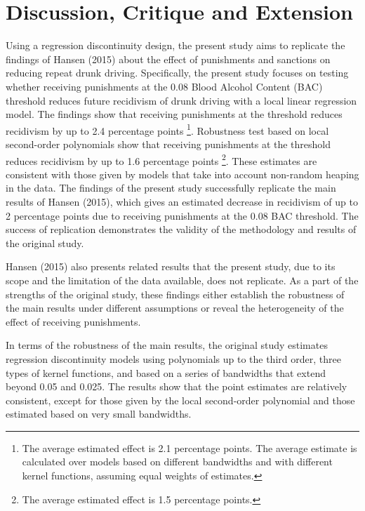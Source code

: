 \documentclass[
  11pt,
]{article}
\begin{document}
\endgroup

\hypertarget{discussion-critique-and-extension}{%
\section{Discussion, Critique and
Extension}\label{discussion-critique-and-extension}}

Using a regression discontinuity design, the present study aims to
replicate the findings of Hansen (2015) about the effect of punishments
and sanctions on reducing repeat drunk driving. Specifically, the
present study focuses on testing whether receiving punishments at the
0.08 Blood Alcohol Content (BAC) threshold reduces future recidivism of
drunk driving with a local linear regression model. The findings show
that receiving punishments at the threshold reduces recidivism by up to
2.4 percentage points
\footnote{The average estimated effect is 2.1 percentage points. The average estimate is calculated over models based on different bandwidths and with different kernel functions, assuming equal weights of estimates.}.
Robustness test based on local second-order polynomials show that
receiving punishments at the threshold reduces recidivism by up to 1.6
percentage points
\footnote{The average estimated effect is 1.5 percentage points.}. These
estimates are consistent with those given by models that take into
account non-random heaping in the data. The findings of the present
study successfully replicate the main results of Hansen (2015), which
gives an estimated decrease in recidivism of up to 2 percentage points
due to receiving punishments at the 0.08 BAC threshold. The success of
replication demonstrates the validity of the methodology and results of
the original study.

Hansen (2015) also presents related results that the present study, due
to its scope and the limitation of the data available, does not
replicate. As a part of the strengths of the original study, these
findings either establish the robustness of the main results under
different assumptions or reveal the heterogeneity of the effect of
receiving punishments.

In terms of the robustness of the main results, the original study
estimates regression discontinuity models using polynomials up to the
third order, three types of kernel functions, and based on a series of
bandwidths that extend beyond 0.05 and 0.025. The results show that the
point estimates are relatively consistent, except for those given by the
local second-order polynomial and those estimated based on very small
bandwidths.
\end{document}
